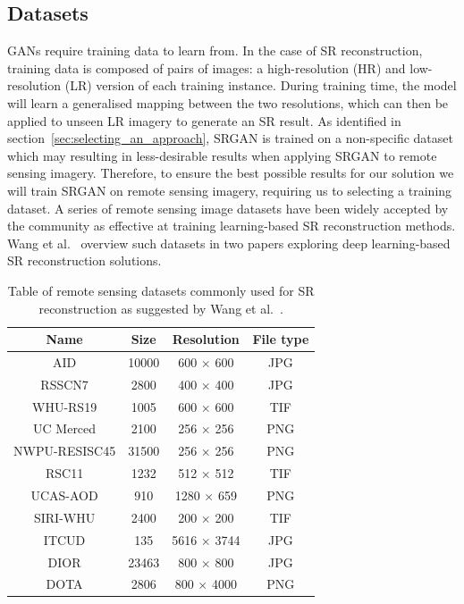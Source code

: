 \subsection{Datasets}
GANs require training data to learn from. In the case of SR reconstruction, training data is composed of pairs of images: a high-resolution (HR) and low-resolution (LR) version of each training instance. During training time, the model will learn a generalised mapping between the two resolutions, which can then be applied to unseen LR imagery to generate an SR result. As identified in section~\ref{sec:selecting_an_approach}, SRGAN is trained on a non-specific dataset which may resulting in less-desirable results when applying SRGAN to remote sensing imagery. Therefore, to ensure the best possible results for our solution we will train SRGAN on remote sensing imagery, requiring us to selecting a training dataset. A series of remote sensing image datasets have been widely accepted by the community as effective at training learning-based SR reconstruction methods. Wang et al.~\cite{remoteSensingDeepLearningReview, remoteSensingGANsReview} overview such datasets in two papers exploring deep learning-based SR reconstruction solutions.
\begin{table}
    \centering
    \begin{tabular}{cccc}
        \toprule
        \textbf{Name} & \textbf{Size} & \textbf{Resolution} & \textbf{File type} \\
        \midrule
        AID & 10000 & 600 $\times$ 600 & JPG \\
        RSSCN7 & 2800 & 400 $\times$ 400 & JPG \\
        WHU-RS19 & 1005 & 600 $\times$ 600 & TIF \\
        UC Merced & 2100 & 256 $\times$ 256 & PNG \\
        NWPU-RESISC45 & 31500 & 256 $\times$ 256 & PNG \\
        RSC11 & 1232 & 512 $\times$ 512 & TIF \\
        UCAS-AOD & 910 & 1280 $\times$ 659 & PNG \\
        SIRI-WHU & 2400 & 200 $\times$ 200 & TIF \\
        ITCUD & 135 & 5616 $\times$ 3744 & JPG \\
        DIOR & 23463 & 800 $\times$ 800 & JPG \\
        DOTA & 2806 & 800 $\times$ 4000 & PNG \\
        \bottomrule
    \end{tabular}
    \caption{Table of remote sensing datasets commonly used for SR reconstruction as suggested by Wang et al.~\cite{remoteSensingDeepLearningReview,remoteSensingGANsReview}.}
    \label{table:datasets_table}
\end{table}

